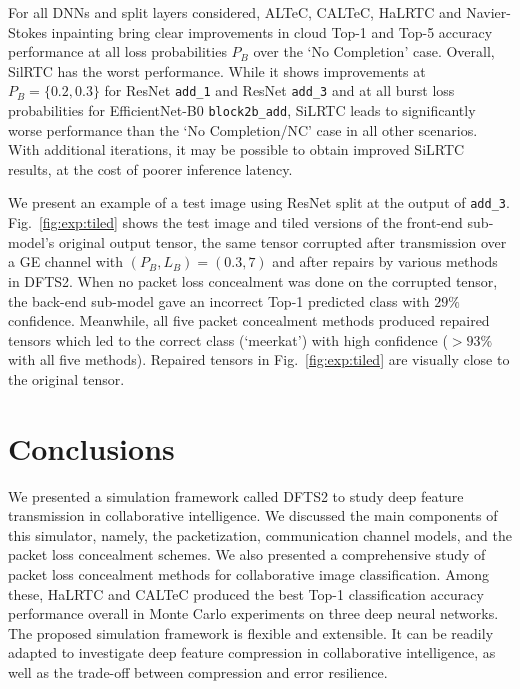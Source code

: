 \documentclass[conference,letterpaper]{IEEEtran}
\begin{document}
For all DNNs and split layers considered, ALTeC, CALTeC, HaLRTC and Navier-Stokes inpainting bring clear improvements in cloud Top-1 and Top-5 accuracy performance at all loss probabilities $P_B$ over the `No Completion' case. Overall, SilRTC has the worst performance. %
While it shows improvements at $P_B = \{0.2,0.3\}$ for ResNet \texttt{add\_1} and ResNet \texttt{add\_3} and at all burst loss probabilities for EfficientNet\nobreakdash-B0 \texttt{block2b\_add}, SiLRTC leads to significantly worse performance than the `No Completion/NC' case in all other scenarios. With additional iterations, it may be possible to obtain improved SiLRTC results, at the cost of poorer inference latency.

We present an example of a test image using ResNet split at the output of \texttt{add\_3}. Fig.~\ref{fig:exp:tiled} shows the test image and tiled versions of the front-end sub-model's original output tensor, the same tensor corrupted after transmission over a GE channel with $(P_B,L_B) = (0.3,7)$ and after repairs by various methods in DFTS2. %
When no packet loss concealment was done on the corrupted tensor, the back-end sub-model gave an incorrect Top-1 predicted class with $29\%$ confidence. Meanwhile, all five packet concealment methods produced repaired tensors which led to the correct class (`meerkat') %
with high confidence ($>93\%$ with all five methods).
Repaired tensors in Fig.~\ref{fig:exp:tiled} are visually close to the original tensor.

\section{Conclusions} \label{sec:conclusions}
We presented a simulation framework called DFTS2 to study deep feature transmission in collaborative intelligence. We discussed the main components of this simulator, namely, the packetization, communication channel models, and the packet loss concealment schemes. We also presented a comprehensive study of packet loss concealment methods for collaborative image classification. Among these, HaLRTC and CALTeC produced the best Top-1 classification accuracy performance overall in Monte Carlo experiments on three deep neural networks. The proposed simulation framework is flexible and extensible. It can be readily adapted to investigate deep feature compression in collaborative intelligence, as well as the trade-off between compression and error resilience. %



\end{document}
